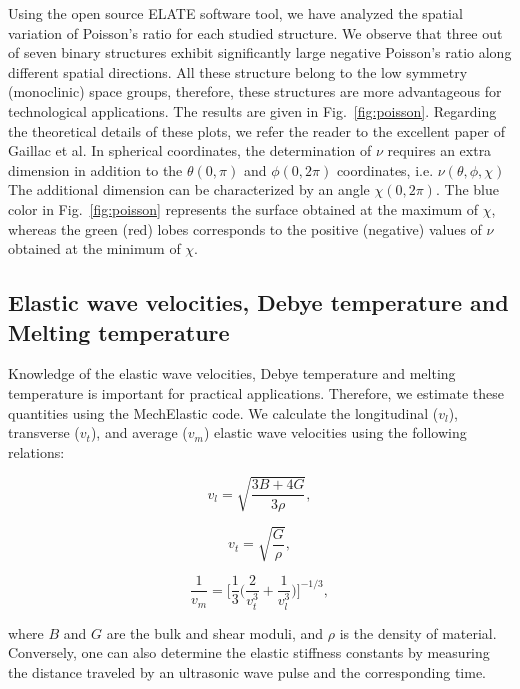 \documentclass[twocolumn,superscriptaddress,nofootinbib,floatfix,aps,showpacs,prb,citeautoscript,reprint]{revtex4-1}
\begin{document}
Using the open source {\sc ELATE} software tool,\cite{GaillacJPCM, elate} we have analyzed the spatial variation of Poisson's ratio for each studied structure. We observe that three out of seven binary structures exhibit significantly large negative Poisson's ratio along different spatial directions. All these structure belong to the low symmetry (monoclinic) space groups, therefore, these structures are more advantageous for technological applications. The results are given in Fig.~\ref{fig:poisson}. Regarding the theoretical details of these plots, we refer the reader to the excellent paper of Gaillac et al.\cite{GaillacJPCM} In spherical coordinates, the determination of $\nu$ requires an extra dimension in addition to the $\theta (0, \pi)$ and $\phi (0, 2\pi)$ coordinates, i.e. $\nu(\theta, \phi, \chi)$ The additional dimension can be characterized by an angle $\chi (0, 2\pi)$.\cite{GaillacJPCM, MARMIER2010} The blue color in Fig.~\ref{fig:poisson} represents the surface obtained at the maximum of $\chi$, whereas the green (red) lobes corresponds to the positive (negative) values of $\nu$ obtained at the minimum of $\chi$. 




\subsection{Elastic wave velocities, Debye temperature and Melting temperature}


Knowledge of the elastic wave velocities, Debye temperature and melting temperature is important for practical applications. Therefore, we estimate these quantities using the MechElastic code.\cite{MechElastic} We calculate the longitudinal ($v_l$), transverse ($v_t$), and average ($v_m$) elastic wave velocities using the following relations: \cite{ANDERSON1962, screiber1973elastic}

\begin{equation}
v_{l} = \sqrt{\frac{3B + 4G}{3\rho}},
\end{equation}

\begin{equation}
v_{t} = \sqrt{\frac{G}{\rho}},
\end{equation}

\begin{equation}
\frac{1}{v_{m}} =  \bigg[\frac{1}{3}\bigg(\frac{2}{v_{t}^3} + \frac{1}{v_{l}^3}\bigg)\bigg]^{-1/3},
\end{equation}

where $B$ and $G$ are the bulk and shear moduli, and $\rho$ is the density of material. Conversely, one can also determine the elastic stiffness constants by measuring the distance traveled by an ultrasonic wave pulse and the corresponding time. 
\end{document}
